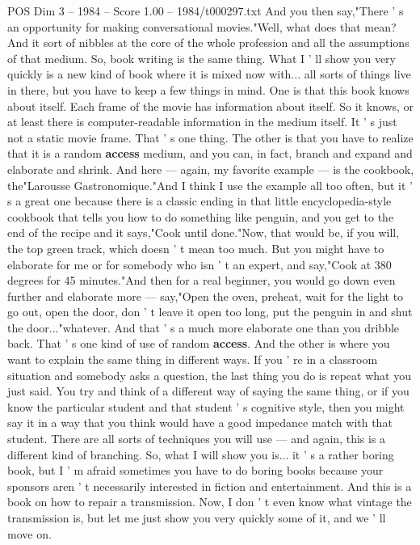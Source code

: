 \begin{textsample}{POS Dim 3 – 1984 – Score 1.00 – 1984/t000297.txt}
And you then say,"There ' s an opportunity for making conversational movies."Well, what does that mean?
And it sort of nibbles at the core of the whole profession and all the assumptions of that medium.
So, book writing is the same thing.
What I ' ll show you very quickly is a new kind of book where it is mixed now with... all sorts of things live in there, but you have to keep a few things in mind.
One is that this book knows about itself.
Each frame of the movie has information about itself.
So it knows, or at least there is computer-readable information in the medium itself.
It ' s just not a static movie frame.
That ' s one thing.
The other is that you have to realize that it is a random \textbf{access} medium, and you can, in fact, branch and expand and elaborate and shrink.
And here — again, my favorite example — is the cookbook, the"Larousse Gastronomique."And I think I use the example all too often, but it ' s a great one because there is a classic ending in that little encyclopedia-style cookbook that tells you how to do something like penguin, and you get to the end of the recipe and it says,"Cook until done."Now, that would be, if you will, the top green track, which doesn ' t mean too much.
But you might have to elaborate for me or for somebody who isn ' t an expert, and say,"Cook at 380 degrees for 45 minutes."And then for a real beginner, you would go down even further and elaborate more — say,"Open the oven, preheat, wait for the light to go out, open the door, don ' t leave it open too long, put the penguin in and shut the door..."whatever.
And that ' s a much more elaborate one than you dribble back.
That ' s one kind of use of random \textbf{access}.
And the other is where you want to explain the same thing in different ways.
If you ' re in a classroom situation and somebody asks a question, the last thing you do is repeat what you just said.
You try and think of a different way of saying the same thing, or if you know the particular student and that student ' s cognitive style, then you might say it in a way that you think would have a good impedance match with that student.
There are all sorts of techniques you will use — and again, this is a different kind of branching.
So, what I will show you is... it ' s a rather boring book, but I ' m afraid sometimes you have to do boring books because your sponsors aren ' t necessarily interested in fiction and entertainment.
And this is a book on how to repair a transmission.
Now, I don ' t even know what vintage the transmission is, but let me just show you very quickly some of it, and we ' ll move on.

\end{textsample}
